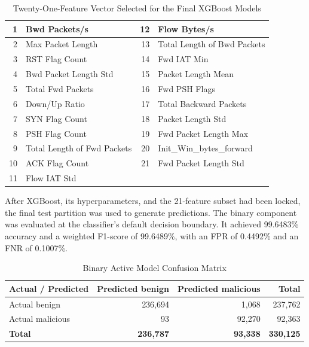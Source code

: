 \begin{table}[H]
  \caption{Twenty-One-Feature Vector Selected for the Final XGBoost Models}
  \centering
  \small
  \begin{tabularx}{\textwidth}{|r|X|r|X|}
    \hline
    1 & Bwd Packets/s & 12 & Flow Bytes/s \\ \hline
    2 & Max Packet Length & 13 & Total Length of Bwd Packets \\ \hline
    3 & RST Flag Count & 14 & Fwd IAT Min \\ \hline
    4 & Bwd Packet Length Std & 15 & Packet Length Mean \\ \hline
    5 & Total Fwd Packets & 16 & Fwd PSH Flags \\ \hline
    6 & Down/Up Ratio & 17 & Total Backward Packets \\ \hline
    7 & SYN Flag Count & 18 & Packet Length Std \\ \hline
    8 & PSH Flag Count & 19 & Fwd Packet Length Max \\ \hline
    9 & Total Length of Fwd Packets & 20 & Init\_Win\_bytes\_forward \\ \hline
    10 & ACK Flag Count & 21 & Fwd Packet Length Std \\ \hline
    11 & Flow IAT Std & & \\ \hline
  \end{tabularx}
\end{table}

After XGBoost, its hyperparameters, and the 21-feature subset had been
locked, the final test partition was used to generate predictions. The
binary component was evaluated at the classifier's default decision
boundary. It achieved 99.6483\% accuracy and a weighted F1-score of
99.6489\%, with an FPR of 0.4492\% and an FNR of 0.1007\%.

\begin{table}[H]
  \caption{Binary Active Model Confusion Matrix}
  \centering
  \small
  \begin{tabularx}{\textwidth}{|X|r|r|r|}
    \hline
    \textbf{Actual / Predicted} & \textbf{Predicted benign} & \textbf{Predicted malicious} & \textbf{Total} \\ \hline
    Actual benign & 236,694 & 1,068 & 237,762 \\ \hline
    Actual malicious & 93 & 92,270 & 92,363 \\ \hline
    \textbf{Total} & \textbf{236,787} & \textbf{93,338} & \textbf{330,125} \\ \hline
  \end{tabularx}
\end{table}

